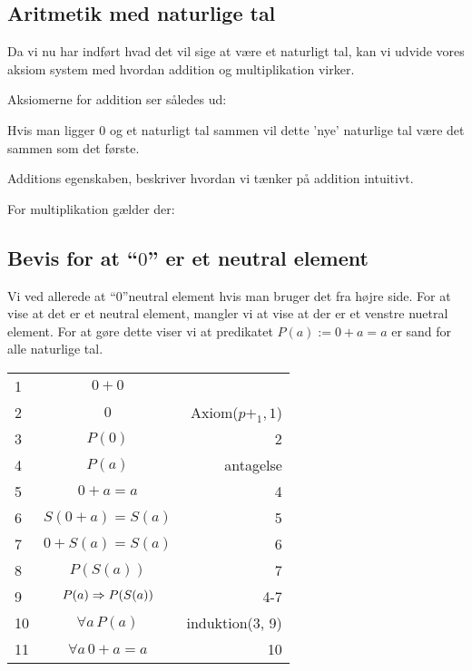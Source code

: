 \subsection*{Aritmetik med naturlige tal}
Da vi nu har indført hvad det vil sige at være et naturligt tal,
kan vi udvide vores aksiom system med hvordan addition og multiplikation virker.

Aksiomerne for addition ser således ud:

\begin{prooftree}
\end{prooftree}
Hvis man ligger 0 og et naturligt tal sammen vil dette 'nye' naturlige tal være det sammen som det første.

\begin{prooftree}
\end{prooftree}
Additions egenskaben, beskriver hvordan vi tænker på addition intuitivt.

For multiplikation gælder der:
\begin{prooftree}
\end{prooftree}

\begin{prooftree}
\end{prooftree}

\subsection*{Bevis for at ``$0$'' er et neutral element}
Vi ved allerede at ``$0$''neutral element hvis man bruger det fra højre side.
For at vise at det er et neutral element,
mangler vi at vise at der er et venstre nuetral element.
For at gøre dette viser vi at predikatet $P(a) := 0+a = a$ er sand for alle naturlige tal.

\begin{tabular}{l c r}
    1 & $0+0$ & \\
    2 & $0$ & Axiom($p+_1, 1$) \\
    3 & $P(0)$ & 2 \\
    \hline
    4 & $P(a)$ & antagelse \\
    5 & $0+a = a$ & 4 \\
    6 & $S(0+a) = S(a)$ & 5 \\
    7 & $0+S(a) = S(a)$ & 6 \\
    8 & $P(S(a))$ & 7 \\
    \hline
    9 & $P(a) \imp P(S(a))$ & 4-7 \\
    10 & $\forall a\, P(a)$ & induktion(3, 9) \\
    11 & $\forall a\, 0+a = a$ & 10
\end{tabular}

